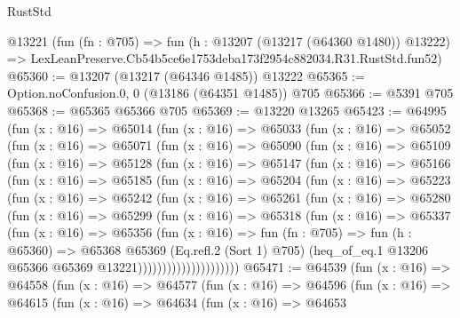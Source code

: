 \begin{lexlean}{RustStd}
\begin{coremodule}
    @13221
    (fun (fn : @705) =>
    fun (h : @13207 (@13217 (@64360 @1480)) @13222) =>
    LexLeanPreserve.Cb54b5ce6e1753deba173f2954c882034.R31.RustStd.fun52)
@65360 := @13207 (@13217 (@64346 @1485)) @13222
@65365 := Option.noConfusion.{0, 0} (@13186 (@64351 @1485)) @705
@65366 := @5391 @705
@65368 := @65365 @65366 @705
@65369 := @13220 @13265
@65423 := @64995
    (fun (x : @16) =>
    @65014
      (fun (x : @16) =>
      @65033
        (fun (x : @16) =>
        @65052
          (fun (x : @16) =>
          @65071
            (fun (x : @16) =>
            @65090
              (fun (x : @16) =>
              @65109
                (fun (x : @16) =>
                @65128
                  (fun (x : @16) =>
                  @65147
                    (fun (x : @16) =>
                    @65166
                      (fun (x : @16) =>
                      @65185
                        (fun (x : @16) =>
                        @65204
                          (fun (x : @16) =>
                          @65223
                            (fun (x : @16) =>
                            @65242
                              (fun (x : @16) =>
                              @65261
                                (fun (x : @16) =>
                                @65280
                                  (fun (x : @16) =>
                                  @65299
                                    (fun (x : @16) =>
                                    @65318
                                      (fun (x : @16) =>
                                      @65337
                                        (fun (x : @16) =>
                                        @65356
                                          (fun (x : @16) =>
                                          fun (fn : @705) =>
                                          fun (h : @65360) =>
                                          @65368
                                            @65369
                                            (Eq.refl.{2} (Sort 1) @705)
                                            (heq_of_eq.{1}
                                              @13206
                                              @65366
                                              @65369
                                              @13221)))))))))))))))))))))
@65471 := @64539
    (fun (x : @16) =>
    @64558
      (fun (x : @16) =>
      @64577
        (fun (x : @16) =>
        @64596
          (fun (x : @16) =>
          @64615
            (fun (x : @16) =>
            @64634
              (fun (x : @16) =>
              @64653

\end{coremodule}
\end{lexlean}
